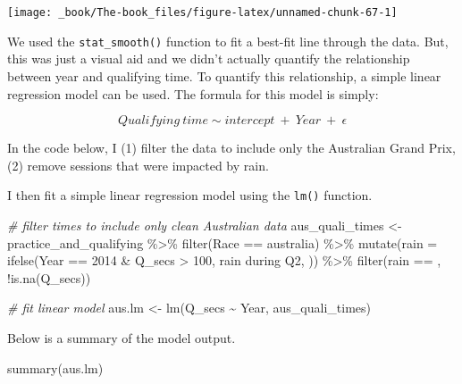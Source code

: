 \documentclass[
]{book}
\newenvironment{Shaded}{\begin{snugshade}}{\end{snugshade}}
\newcommand{\AttributeTok}[1]{\textcolor[rgb]{0.77,0.63,0.00}{#1}}
\newcommand{\CommentTok}[1]{\textcolor[rgb]{0.56,0.35,0.01}{\textit{#1}}}
\newcommand{\DecValTok}[1]{\textcolor[rgb]{0.00,0.00,0.81}{#1}}
\newcommand{\FunctionTok}[1]{\textcolor[rgb]{0.00,0.00,0.00}{#1}}
\newcommand{\NormalTok}[1]{#1}
\newcommand{\OtherTok}[1]{\textcolor[rgb]{0.56,0.35,0.01}{#1}}
\newcommand{\SpecialCharTok}[1]{\textcolor[rgb]{0.00,0.00,0.00}{#1}}
\newcommand{\StringTok}[1]{\textcolor[rgb]{0.31,0.60,0.02}{#1}}
\begin{document}
\begin{center}\texttt{[image: \_book/The-book\_files/figure-latex/unnamed-chunk-67-1]} \end{center}

We used the \texttt{stat\_smooth()} function to fit a best-fit line through the data. But, this was just a visual aid and we didn't actually quantify the relationship between year and qualifying time. To quantify this relationship, a simple linear regression model can be used. The formula for this model is simply:

\[Qualifying \ time \sim intercept \ + \ Year \ + \ \epsilon\]

In the code below, I (1) filter the data to include only the Australian Grand Prix, (2) remove sessions that were impacted by rain.

I then fit a simple linear regression model using the \texttt{lm()} function.

\begin{Shaded}
\begin{Highlighting}[]
\CommentTok{\# filter times to include only clean Australian data}
\NormalTok{aus\_quali\_times }\OtherTok{\textless{}{-}}\NormalTok{ practice\_and\_qualifying }\SpecialCharTok{\%\textgreater{}\%}
  \FunctionTok{filter}\NormalTok{(Race }\SpecialCharTok{==} \StringTok{\textquotesingle{}australia\textquotesingle{}}\NormalTok{) }\SpecialCharTok{\%\textgreater{}\%}
  \FunctionTok{mutate}\NormalTok{(}\AttributeTok{rain =} \FunctionTok{ifelse}\NormalTok{(Year }\SpecialCharTok{==} \DecValTok{2014} \SpecialCharTok{\&}\NormalTok{ Q\_secs }\SpecialCharTok{\textgreater{}} \DecValTok{100}\NormalTok{, }\StringTok{\textquotesingle{}rain during Q2\textquotesingle{}}\NormalTok{, }\StringTok{\textquotesingle{} \textquotesingle{}}\NormalTok{)) }\SpecialCharTok{\%\textgreater{}\%} 
  \FunctionTok{filter}\NormalTok{(rain }\SpecialCharTok{==} \StringTok{\textquotesingle{} \textquotesingle{}}\NormalTok{,}
         \SpecialCharTok{!}\FunctionTok{is.na}\NormalTok{(Q\_secs))}

\CommentTok{\# fit linear model}
\NormalTok{aus.lm }\OtherTok{\textless{}{-}} \FunctionTok{lm}\NormalTok{(Q\_secs }\SpecialCharTok{\textasciitilde{}}\NormalTok{ Year, aus\_quali\_times)}
\end{Highlighting}
\end{Shaded}

Below is a summary of the model output.

\begin{Shaded}
\begin{Highlighting}[]
\FunctionTok{summary}\NormalTok{(aus.lm)}
\end{Highlighting}
\end{Shaded}
\end{document}
